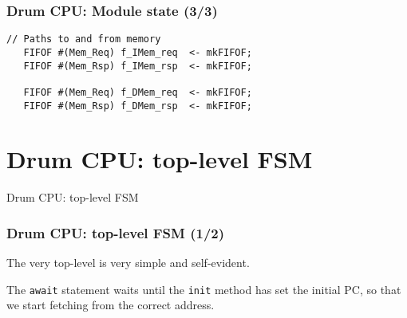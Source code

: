 
\begin{frame}[fragile]
\frametitle{Drum CPU: Module state (3/3)}

\footnotesize

\begin{minipage}{0.725\textwidth}
\begin{Verbatim}[frame=single, label=From src\_Drum/CPU.bsv]
   // Paths to and from memory
   FIFOF #(Mem_Req) f_IMem_req  <- mkFIFOF;
   FIFOF #(Mem_Rsp) f_IMem_rsp  <- mkFIFOF;

   FIFOF #(Mem_Req) f_DMem_req  <- mkFIFOF;
   FIFOF #(Mem_Rsp) f_DMem_rsp  <- mkFIFOF;
\end{Verbatim}
\end{minipage}

\end{frame}


\section{Drum CPU: top-level FSM}

\begin{frame}[fragile]

\begin{center}
  {\LARGE Drum CPU: top-level FSM}
\end{center}

\end{frame}


\begin{frame}[fragile]
\frametitle{Drum CPU: top-level FSM (1/2)}

\footnotesize

\begin{minipage}{0.725\textwidth}
\end{minipage}

\vspace{5ex}

The very top-level is very simple and self-evident.

\vspace{2ex}

The {\tt await} statement waits until the {\tt init} method has set
the initial PC, so that we start fetching from the correct address.

\end{frame}

